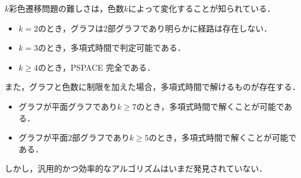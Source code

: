 $k$彩色遷移問題の難しさは，色数$k$によって変化することが知られている． 
\begin{itemize}
  \item $k = 2$のとき，グラフは2部グラフであり明らかに経路は存在しない． \cite{CHM2011:JGT}
  \item $k = 3$のとき，多項式時間で判定可能である． \cite{CHM2011:JGT}
  \item $k \geq 4$のとき，PSPACE 完全である． \cite{BC2009:tcs}
\end{itemize}
また，グラフと色数に制限を加えた場合，多項式時間で解けるものが存在する． \cite{BC2009:tcs}
\begin{itemize}
  \item グラフが平面グラフであり$k \geq 7$のとき，多項式時間で解くことが可能である．
  \item グラフが平面2部グラフであり$k \geq 5$のとき，多項式時間で解くことが可能である．
\end{itemize}
しかし，汎用的かつ効率的なアルゴリズムはいまだ発見されていない．

